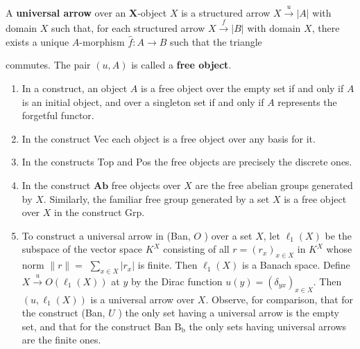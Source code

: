 A \textbf{universal arrow} over an $\mathbf{X}$-object $X$ is a structured arrow $X \xrightarrow{u}|A|$ with domain $X$ such that, for each structured arrow $X \xrightarrow{f}|B|$ with domain $X$, there exists a unique $A$-morphism $\hat{f}: A \rightarrow B$ such that the triangle 
 commutes. The pair $(u,A)$ is called a \textbf{free object}.

\begin{example}
\begin{enumerate}
    \item In a construct, an object $A$ is a free object over the empty set if and only if $A$ is an initial object, and over a singleton set if and only if $A$ represents the forgetful functor.
    \item In the construct Vec each object is a free object over any basis for it.
    \item In the constructs Top and Pos the free objects are precisely the discrete ones.
    \item In the construct $\mathbf{A b}$ free objects over $X$ are the free abelian groups generated by $X$.
    Similarly, the familiar free group generated by a set $X$ is a free object over $X$ in the construct Grp.
    \item To construct a universal arrow in (Ban, $O$ ) over a set $X$, let $\ell_1(X)$ be the subspace of the vector space $K^X$ consisting of all $r=\left(r_x\right)_{x \in X}$ in $K^X$ whose norm $\|r\|=$ $\sum_{x \in X}\left|r_x\right|$ is finite. Then $\ell_1(X)$ is a Banach space. Define $X \xrightarrow{u} O\left(\ell_1(X)\right)$ at $y$ by the Dirac function $u(y)=\left(\delta_{y x}\right)_{x \in X}$. Then $\left(u, \ell_1(X)\right)$ is a universal arrow over $X$. Observe, for comparison, that for the construct (Ban, $U$ ) the only set having a universal arrow is the empty set, and that for the construct Ban $\mathrm{B}_{\mathrm{b}}$ the only sets having universal arrows are the finite ones.
\end{enumerate}
\end{example}


